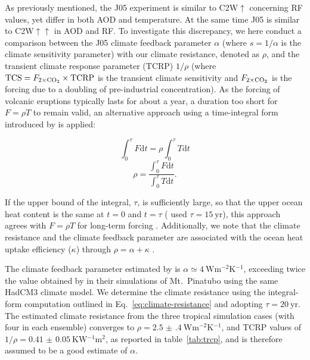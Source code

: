 \documentclass[draft]{agujournal2019}
\begin{document}
  As previously mentioned, the J05 experiment is similar to C2W\(\uparrow\) concerning
  RF values, yet differ in both AOD and temperature. At the same time J05 is similar to
  C2W\(\uparrow\uparrow\) in AOD and RF. To investigate this discrepancy, we here
  conduct a comparison between the J05 climate feedback parameter \(\alpha\) (where
  \(s=1/\alpha\) is the climate sensitivity parameter) with our climate resistance,
  denoted as \(\rho\), and the transient climate response parameter (TCRP) \(1/\rho\)
  (where \(\mathrm{TCS}=F_{2\times\ce{CO2}}\times \mathrm{TCRP}\) is the transient
  climate sensitivity and \(F_{2\times\ce{CO2}}\) is the forcing due to a doubling of
  pre-industrial  concentration). As the forcing of volcanic eruptions typically
  lasts for about a year, a duration too short for \(F=\rho T\) to remain valid, an
  alternative approach using a time-integral form introduced by  is
  applied:

  \begin{equation}
    \int_0^{\tau}F \mathrm{d}t=\rho\int_{0}^{\tau}T \mathrm{d}t
    \label{eq:climate-resistance-orig}
  \end{equation}
  \begin{equation}
    \rho=\frac{\int_0^{\tau}F \mathrm{d}t}{\int_{0}^{\tau}T \mathrm{d}t}.
    \label{eq:climate-resistance}
  \end{equation}

  If the upper bound of the integral, \(\tau\), is sufficiently large, so that the upper
  ocean heat content is the same at \(t=0\) and \(t=\tau\) ( used
  \(\tau =\SI{15}{\mathrm{yr}}\)), this approach agrees with \(F=\rho T\) for long-term
  forcing \cite{gregory2016}. Additionally, we note that the climate resistance and the
  climate feedback parameter are associated with the ocean heat uptake efficiency
  (\(\kappa\)) through \(\rho =\alpha +\kappa\) \cite{gregory2016}.

  The climate feedback parameter estimated by  is \(\alpha \simeq
  \SI{4}{\watt\metre^{-2}\kelvin^{-1}}\), exceeding twice the value obtained by
   in their simulations of Mt.\ Pinatubo using the same HadCM3
  climate model. We determine the climate resistance using the integral-form computation
  outlined in Eq.~\ref{eq:climate-resistance} and adopting \(\tau
  =\SI{20}{\mathrm{yr}}\). The estimated climate resistance from the three tropical
  simulation cases (with four in each ensemble) converges to \(\rho
  =\SI{2.5(4)}{\watt\metre^{-2}\kelvin^{-1}}\), and TCRP values of
  \(1/\rho=\SI{0.41(5)}{\kelvin\watt^{-1}\metre^{2}}\), as reported in
  table~\ref{tab:trcp}, and is therefore assumed to be a good estimate of \(\alpha\).
\end{document}
